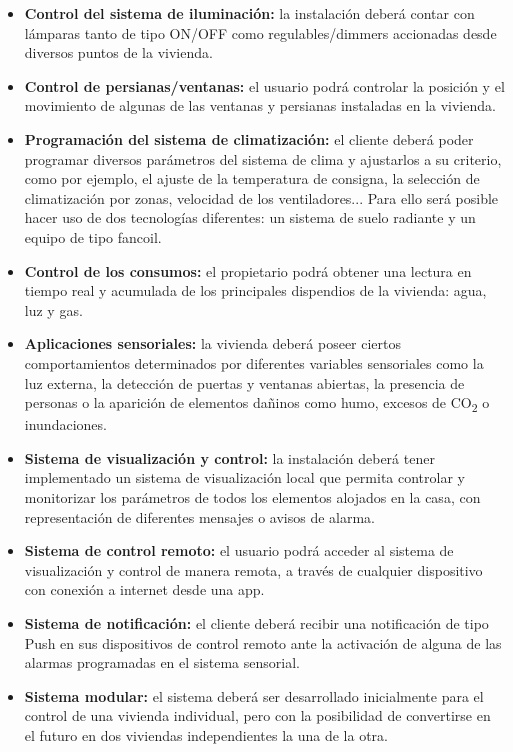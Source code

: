 \begin{itemize}
\item \textbf{Control del sistema de iluminación:} la instalación deberá contar con lámparas tanto de tipo ON/OFF como regulables/dimmers accionadas desde diversos puntos de la vivienda.
\item \textbf{Control de persianas/ventanas:} el usuario podrá controlar la posición y el movimiento de algunas de las ventanas y persianas instaladas en la vivienda.
\item \textbf{Programación del sistema de climatización: }el cliente deberá poder programar diversos parámetros del sistema de clima y ajustarlos a su criterio, como por ejemplo, el ajuste de la temperatura de consigna, la selección de climatización por zonas, velocidad de los ventiladores... Para ello será posible hacer uso de dos tecnologías diferentes: un sistema de suelo radiante y un equipo de tipo fancoil.
\item \textbf{Control de los consumos: }el propietario podrá obtener una lectura en tiempo real y acumulada de los principales dispendios de la vivienda: agua, luz y gas.
\item \textbf{Aplicaciones sensoriales: }la vivienda deberá poseer ciertos comportamientos determinados por diferentes variables sensoriales como la luz externa, la detección de puertas y ventanas abiertas, la presencia de personas o la aparición de elementos dañinos como humo, excesos de CO\textsubscript{2} o inundaciones.
\item \textbf{Sistema de visualización y control: }la instalación deberá tener implementado un sistema de visualización local que permita controlar y monitorizar los parámetros de todos los elementos alojados en la casa, con representación de diferentes mensajes o avisos de alarma.
\item \textbf{Sistema de control remoto: }el usuario podrá acceder al sistema de visualización y control de manera remota, a través de cualquier dispositivo con conexión a internet desde una app.
\item \textbf{Sistema de notificación: }el cliente deberá recibir una notificación de tipo Push en sus dispositivos de control remoto ante la activación de alguna de las alarmas programadas en el sistema sensorial.
\item \textbf{Sistema modular: }el sistema deberá ser desarrollado inicialmente para el control de una vivienda individual, pero con la posibilidad de convertirse en el futuro en dos viviendas independientes la una de la otra.
\end{itemize}

